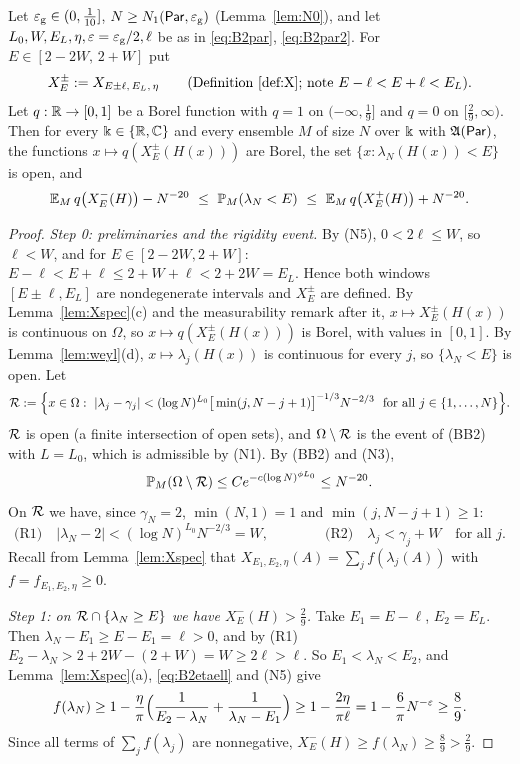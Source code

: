 \begin{proposition}[sandwich]\label{prop:sandwich}
Let $\varepsilon_{\mathrm g}\in(0,\frac1{10}]$, $N\ge N_1(\mathsf{Par},\varepsilon_{\mathrm g})$ (Lemma~\ref{lem:N0}), and let $L_0,W,E_L,\eta,\varepsilon=\varepsilon_{\mathrm g}/2,\ell$ be as in \eqref{eq:B2par}, \eqref{eq:B2par2}.
For $E\in[2-2W,\,2+W]$ put
\[
X^\pm_E:=X_{E\pm\ell,\,E_L,\,\eta}\qquad\text{(Definition~\ref{def:X}; note $E-\ell<E+\ell<E_L$).}
\]
Let $q:\mathbb{R}\to[0,1]$ be a Borel function with $q=1$ on $(-\infty,\frac19]$ and $q=0$ on $[\frac29,\infty)$. Then for every $\Bbbk\in\{\mathbb{R},\mathbb{C}\}$ and every ensemble $M$ of size
$N$ over $\Bbbk$ with $\mathfrak{A}(\mathsf{Par})$, the functions $x\mapsto q(X^\pm_E(H(x)))$ are Borel, the set $\{x:\lambda_N(H(x))<E\}$ is open, and
\[
\E_M\,q\big(X^-_E(H)\big)-N^{-20}\ \le\ \P_M(\lambda_N<E)\ \le\ \E_M\,q\big(X^+_E(H)\big)+N^{-20}.
\]
\end{proposition}
\begin{proof}
\emph{Step 0: preliminaries and the rigidity event.} By (N5), $0<2\ell\le W$, so $\ell<W$, and for $E\in[2-2W,2+W]$:
$E-\ell<E+\ell\le2+W+\ell<2+2W=E_L$. Hence both windows $[E\pm\ell,E_L]$ are nondegenerate intervals and $X^\pm_E$ are defined. By Lemma~\ref{lem:Xspec}(c) and the
measurability remark after it, $x\mapsto X^\pm_E(H(x))$ is continuous on $\Omega$, so $x\mapsto q(X^\pm_E(H(x)))$ is Borel, with values in $[0,1]$.
By Lemma~\ref{lem:weyl}(d), $x\mapsto\lambda_j(H(x))$ is continuous for every $j$, so $\{\lambda_N<E\}$ is open. Let
\[
\cR:=\Big\{x\in\Omega:\ |\lambda_j-\gamma_j|<(\log N)^{L_0}\big[\min(j,N-j+1)\big]^{-1/3}N^{-2/3}\ \text{ for all }j\in\{1,\dots,N\}\Big\}.
\]
$\mathcal{R}$ is open (a finite intersection of open sets), and $\Omega\setminus\mathcal{R}$ is the event of (BB2) with $L=L_0$, which is admissible by (N1). By (BB2) and (N3),
\begin{equation}\label{eq:B2Rc}
\mathbb{P}_M(\Omega\setminus\mathcal{R})\le Ce^{-c(\log N)^{\phi L_0}}\le N^{-20}.
\end{equation}
On $\mathcal{R}$ we have, since $\gamma_N=2$, $\min(N,1)=1$ and $\min(j,N-j+1)\ge1$:
\begin{equation}\label{eq:B2R12}
\text{(R1)}\quad|\lambda_N-2|<(\log N)^{L_0}N^{-2/3}=W,\qquad\qquad\text{(R2)}\quad\lambda_j<\gamma_j+W\quad\text{for all }j.
\end{equation}
Recall from Lemma~\ref{lem:Xspec} that $X_{E_1,E_2,\eta}(A)=\sum_jf(\lambda_j(A))$ with $f=f_{E_1,E_2,\eta}\ge0$.

\emph{Step 1: on $\mathcal{R}\cap\{\lambda_N\ge E\}$ we have $X^-_E(H)>\frac29$.} Take $E_1=E-\ell$, $E_2=E_L$. Then $\lambda_N-E_1\ge E-E_1=\ell>0$, and by (R1)
$E_2-\lambda_N>2+2W-(2+W)=W\ge2\ell>\ell$. So $E_1<\lambda_N<E_2$, and Lemma~\ref{lem:Xspec}(a), \eqref{eq:B2etaell} and (N5) give
\[
f(\lambda_N)\ge1-\frac\eta\pi\Big(\frac1{E_2-\lambda_N}+\frac1{\lambda_N-E_1}\Big)\ge1-\frac{2\eta}{\pi\ell}=1-\frac6\pi N^{-\varepsilon}\ge\frac89 .
\]
Since all terms of $\sum_jf(\lambda_j)$ are nonnegative, $X^-_E(H)\ge f(\lambda_N)\ge\frac89>\frac29$.


\end{proof}
